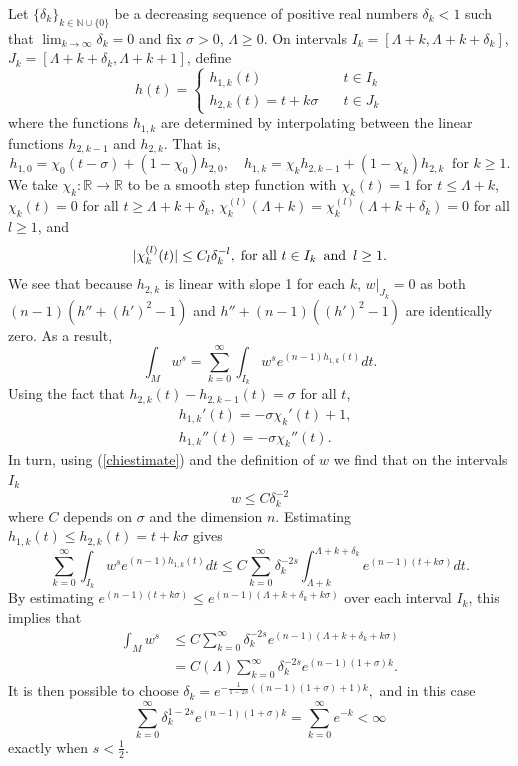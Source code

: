 \documentclass{amsart}
\theoremstyle{definition}
\theoremstyle{remark}
\numberwithin{equation}{section}
\begin{document}
Let $\{\delta_k\}_{k\in\mathbb{N}\cup\{0\}}$ be a decreasing sequence of positive real numbers $\delta_k<1$ such that $\lim_{k\to\infty}\delta_k=0$ and fix $\sigma>0$, $\Lambda\geq 0$. On intervals $I_k = [\Lambda+k,\Lambda + k + \delta_k]$, $J_k = [\Lambda+k+\delta_k,\Lambda+k+1]$, define
\[
h(t) = 
\begin{cases}
    h_{1,k}(t) &\quad t\in I_k\\
    h_{2,k}(t)=t+k\sigma &\quad t\in J_k
\end{cases}
\]
where the functions $h_{1,k}$ are determined by interpolating between the linear functions $h_{2,k-1}$ and $h_{2,k}$. That is,
\begin{equation*}
h_{1,0} = \chi_0(t-\sigma)+(1-\chi_0)h_{2,0},\quad h_{1,k}=\chi_k h_{2,k-1}+(1-\chi_k)h_{2,k} \;\;\text{for $k\geq 1$.}
\end{equation*}
We take $\chi_k:\mathbb{R}\to\mathbb{R}$ to be a smooth step function with $\chi_k(t)= 1$ for $t\leq \Lambda+k$, $\chi_k(t)= 0$ for all $t\geq \Lambda+k+\delta_k$, $\chi_k^{(l)}(\Lambda+k)=\chi_k^{(l)}(\Lambda+k+\delta_k)=0$ for all $l\geq 1$, and
\begin{equation}\label{chiestimate}
|\chi_k^{(l)}(t)|\leq C_l\delta_k^{-l},\; \text{for all $t\in I_k$\, and\, $l\geq 1$}.
\end{equation}
We see that because $h_{2,k}$ is linear with slope 1 for each $k$, $w\big|_{J_k}= 0$ as both $(n-1)(h''+(h')^2-1)$ and $h''+(n-1)((h')^2-1)$ are identically zero. As a result,
\begin{equation*}
\int_M w^s=\sum_{k=0}^\infty \int_{I_k}w^se^{(n-1)h_{1,k}(t)}dt.
\end{equation*}
Using the fact that $h_{2,k}(t)-h_{2,k-1}(t)=\sigma$ for all $t$,
\begin{align*}
&h_{1,k}'(t)=-\sigma\chi_k'(t)+1,\\
&h_{1,k}''(t)=-\sigma\chi_k''(t).
\end{align*}
In turn, using (\ref{chiestimate}) and the definition of $w$ we find that on the intervals $I_k$
\begin{equation*}
w\leq C\delta_k^{-2}
\end{equation*}
where $C$ depends on $\sigma$ and the dimension $n$. Estimating $h_{1,k}(t)\leq h_{2,k}(t)=t+k\sigma$ gives
\begin{equation*}
\sum_{k=0}^\infty \int_{I_k}w^se^{(n-1)h_{1,k}(t)}dt\leq C\sum_{k=0}^\infty \delta_k^{-2s}\int_{\Lambda+k}^{\Lambda+k+\delta_k}e^{(n-1)(t+k\sigma)}dt.
\end{equation*}
By estimating $e^{(n-1)(t+k\sigma)}\leq e^{(n-1)(\Lambda+k+\delta_k+k\sigma)}$ over each interval $I_k$, this implies that
\begin{align*}
\int_Mw^s &\leq C\sum_{k=0}^\infty \delta_k^{-2s}e^{(n-1)(\Lambda+k+\delta_k+k\sigma)}\\
&=C(\Lambda)\sum_{k=0}^\infty \delta_k^{-2s}e^{(n-1)(1+\sigma)k}.
\end{align*}
It is then possible to choose $\delta_k=e^{-\frac{1}{1-2s}((n-1)(1+\sigma)+1)k},$ and in this case
\begin{equation*}
\sum_{k=0}^\infty \delta_k^{1-2s}e^{(n-1)(1+\sigma)k}=\sum_{k=0}^\infty e^{-k}<\infty
\end{equation*}
exactly when $s<\frac{1}{2}$.
\end{document}
